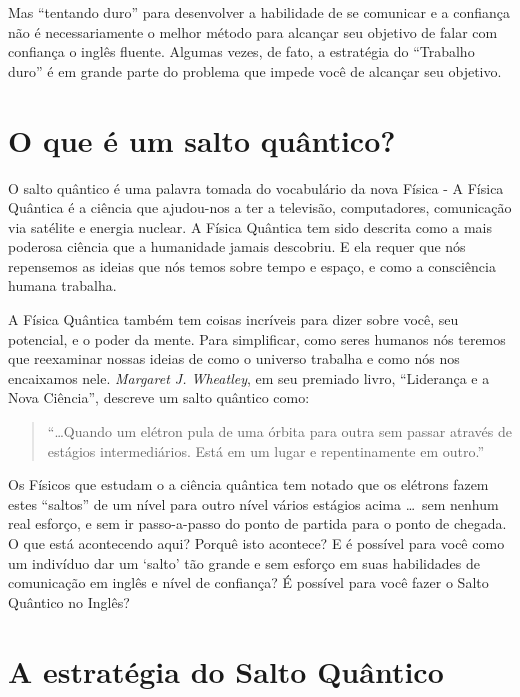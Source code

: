 Mas ``tentando duro'' para desenvolver a habilidade de se comunicar
e a confiança não é necessariamente o melhor método para alcançar seu objetivo
de falar com confiança o inglês fluente. Algumas vezes, de fato, a estratégia
do ``Trabalho duro'' é em grande parte do problema que impede você de alcançar
seu objetivo.

\section{O que é um salto quântico?}
O salto quântico é uma palavra tomada do vocabulário da nova Física - A Física
Quântica é a ciência que ajudou-nos a ter a televisão, computadores,
comunicação via satélite e energia nuclear. A Física Quântica tem sido descrita
como a mais poderosa ciência que a humanidade jamais descobriu. E ela requer
que nós repensemos as ideias que nós temos sobre tempo e espaço, e como
a consciência humana trabalha.

A Física Quântica também tem coisas incríveis para dizer sobre você, seu
potencial, e o poder da mente. Para simplificar, como seres humanos nós teremos
que reexaminar nossas ideias de como o universo trabalha e como nós nos
encaixamos nele. {\em Margaret J. Wheatley}, em seu premiado livro, ``Liderança
e a Nova Ciência'', descreve um salto quântico como:

\begin{quotation}
\noindent
``\dots Quando um elétron pula de uma órbita para outra sem passar através de estágios
intermediários. Está em um lugar e repentinamente em outro.''
\end{quotation}

Os Físicos que estudam o a ciência quântica tem notado que os elétrons fazem
estes ``saltos'' de um nível para outro nível vários estágios acima \dots\ sem
nenhum real esforço, e sem ir passo-a-passo do ponto de partida para
o ponto de chegada. O que está acontecendo aqui? Porquê isto acontece?
E é possível para você como um indivíduo dar um `salto' tão grande e sem esforço em
suas habilidades de comunicação em inglês e nível de confiança? É possível para você fazer
o Salto Quântico no Inglês?

\newpage
\section{A estratégia do Salto Quântico}\label{sec:estrategia}

